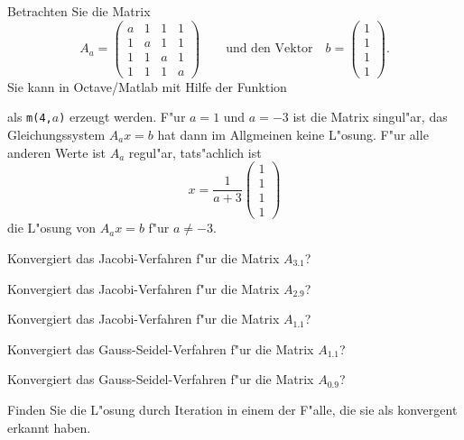 Betrachten Sie die Matrix
\[
A_a=\begin{pmatrix}
a&1&1&1\\
1&a&1&1\\
1&1&a&1\\
1&1&1&a
\end{pmatrix}
\qquad\text{und den Vektor}\quad
b=\begin{pmatrix}1\\1\\1\\1\end{pmatrix}.
\]
Sie kann in Octave/Matlab mit Hilfe der Funktion

als {\tt m(4,$a$)} erzeugt werden. 
F"ur $a=1$ und $a=-3$ ist die Matrix singul"ar, 
das Gleichungssystem $A_ax=b$ hat dann im Allgmeinen keine L"osung.
F"ur alle anderen Werte ist $A_a$ regul"ar, tats"achlich ist 
\[
x=\frac1{a+3}\begin{pmatrix}1\\1\\1\\1\end{pmatrix}
\]
die L"osung von $A_ax=b$ f"ur $a\ne -3$.
\begin{teilaufgaben}
\item Konvergiert das Jacobi-Verfahren f"ur die Matrix $A_{3.1}$?
\item Konvergiert das Jacobi-Verfahren f"ur die Matrix $A_{2.9}$?
\item Konvergiert das Jacobi-Verfahren f"ur die Matrix $A_{1.1}$?
\item Konvergiert das Gauss-Seidel-Verfahren f"ur die Matrix $A_{1.1}$?
\item Konvergiert das Gauss-Seidel-Verfahren f"ur die Matrix $A_{0.9}$?
\item Finden Sie die L"osung durch Iteration in einem der F"alle, die sie
als konvergent erkannt haben.
\end{teilaufgaben}

